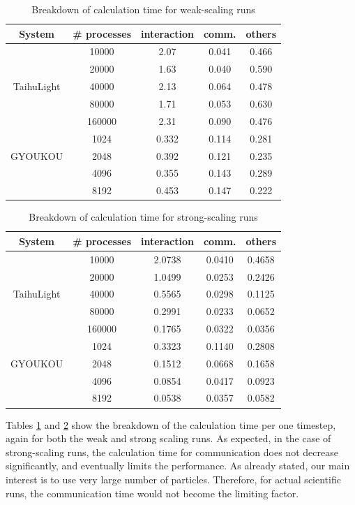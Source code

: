 \documentclass[conference]{IEEEtran}
\begin{document}
\begin{table}
\centering
  \caption{Breakdown of calculation time for weak-scaling runs}
  \label{tab:timeweak}
  \begin{tabular}{ccccc}
    \hline
 System  & \# processes & interaction & comm. & others\\
    \hline  
&10000 &   2.07& 0.041 & 0.466\\
&20000 &  1.63& 0.040  & 0.590 \\
TaihuLight &40000  &  2.13 & 0.064 & 0.478 \\
&80000 &   1.71 & 0.053 & 0.630\\
&160000 &  2.31& 0.090& 0.476\\
\hline
&1024&  0.332 &  0.114 & 0.281\\
GYOUKOU &2048&   0.392 & 0.121 & 0.235\\
&4096&  0.355 & 0.143& 0.289\\
&8192   & 0.453& 0.147&     0.222\\
\hline
\end{tabular}
\end{table}

\begin{table}
\centering
  \caption{Breakdown of calculation time for strong-scaling runs}
  \label{tab:timestrong}
  \begin{tabular}{ccccc}
    \hline
 System  & \# processes & interaction & comm. & others\\
    \hline  
& 10000& 2.0738 & 0.0410 & 0.4658 \\
& 20000& 1.0499 & 0.0253 & 0.2426 \\
TaihuLight & 40000& 0.5565 & 0.0298 & 0.1125 \\
& 80000& 0.2991 & 0.0233 & 0.0652 \\
& 160000& 0.1765 & 0.0322 & 0.0356 \\
\hline
& 1024& 0.3323 & 0.1140 & 0.2808 \\
GYOUKOU & 2048& 0.1512 & 0.0668 & 0.1658 \\
& 4096& 0.0854 & 0.0417 & 0.0923 \\
& 8192& 0.0538 & 0.0357 & 0.0582 \\
    \hline  
\end{tabular}
\end{table}
 
Tables \ref{tab:timeweak} and \ref{tab:timestrong} show the breakdown
of the calculation time per one timestep, again for both the weak and
strong scaling runs. As expected, in the case of strong-scaling runs,
the calculation time for communication does not decrease
significantly, and eventually limits the performance.  As already
stated, our main interest is to use very large number of
particles. Therefore, for actual scientific runs, the communication
time would not become the limiting factor.
\end{document}
